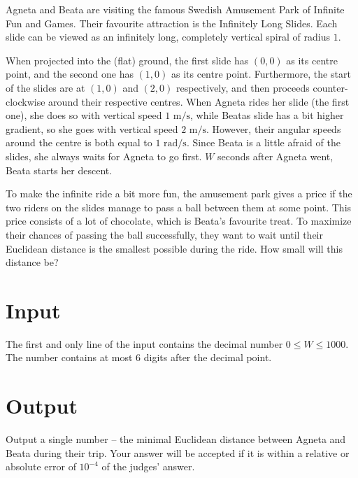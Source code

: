 Agneta and Beata are visiting the famous Swedish Amusement Park of Infinite Fun and Games.
Their favourite attraction is the Infinitely Long Slides.
Each slide can be viewed as an infinitely long, completely vertical spiral of radius $1$.

When projected into the (flat) ground, the first slide has $(0, 0)$ as its centre point, and the second one has $(1, 0)$ as its centre point.
Furthermore, the start of the slides are at $(1, 0)$ and $(2, 0)$ respectively, and then proceeds counter-clockwise around their respective centres.
When Agneta rides her slide (the first one), she does so with vertical speed $1\text{ m/s}$, while Beatas slide has a bit higher gradient, so she goes with vertical speed $2\text{ m/s}$.
However, their angular speeds around the centre is both equal to $1 \text{ rad/s}$.
Since Beata is a little afraid of the slides, she always waits for Agneta to go first.
$W$ seconds after Agneta went, Beata starts her descent.

To make the infinite ride a bit more fun, the amusement park gives a price if the two riders on the slides manage to pass a ball between them at some point.
This price consists of a lot of chocolate, which is Beata's favourite treat.
To maximize their chances of passing the ball successfully, they want to wait until their Euclidean distance is the smallest possible during the ride.
How small will this distance be?

\section*{Input}
The first and only line of the input contains the decimal number $0 \le W \le 1000$.
The number contains at most $6$ digits after the decimal point.

\section*{Output}
Output a single number -- the minimal Euclidean distance between Agneta and Beata during their trip.
Your answer will be accepted if it is within a relative or absolute error of $10^{-4}$ of the judges' answer.
